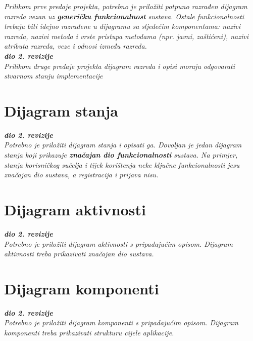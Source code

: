 			
			\textit{Prilikom prve predaje projekta, potrebno je priložiti potpuno razrađen dijagram razreda vezan uz \textbf{generičku funkcionalnost} sustava. Ostale funkcionalnosti trebaju biti idejno razrađene u dijagramu sa sljedećim komponentama: nazivi razreda, nazivi metoda i vrste pristupa metodama (npr. javni, zaštićeni), nazivi atributa razreda, veze i odnosi između razreda.}\\
			
			\textbf{\textit{dio 2. revizije}}\\			
			
			\textit{Prilikom druge predaje projekta dijagram razreda i opisi moraju odgovarati stvarnom stanju implementacije}
			
			
			
			\eject
		
		\section{Dijagram stanja}
			
			
			\textbf{\textit{dio 2. revizije}}\\
			
			\textit{Potrebno je priložiti dijagram stanja i opisati ga. Dovoljan je jedan dijagram stanja koji prikazuje \textbf{značajan dio funkcionalnosti} sustava. Na primjer, stanja korisničkog sučelja i tijek korištenja neke ključne funkcionalnosti jesu značajan dio sustava, a registracija i prijava nisu. }
			
			
			\eject 
		
		\section{Dijagram aktivnosti}
			
			\textbf{\textit{dio 2. revizije}}\\
			
			 \textit{Potrebno je priložiti dijagram aktivnosti s pripadajućim opisom. Dijagram aktivnosti treba prikazivati značajan dio sustava.}
			
			\eject
		\section{Dijagram komponenti}
		
			\textbf{\textit{dio 2. revizije}}\\
		
			 \textit{Potrebno je priložiti dijagram komponenti s pripadajućim opisom. Dijagram komponenti treba prikazivati strukturu cijele aplikacije.}